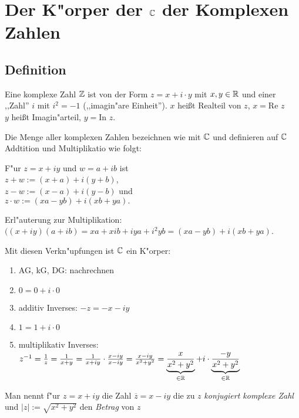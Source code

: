\section{Der K"orper der $\mathbb{C}$ der Komplexen Zahlen} 

\subsection{Definition}
Eine komplexe Zahl $\mathbb{Z}$ ist von der Form $z=x+i\cdot y$ mit $x, y \in \mathbb{R}$ und einer ,,Zahl'' $i$ mit $i^2=-1$ (,,imagin"are Einheit''). $x$ heißt Realteil von $z$, $x=$Re $z$\\
$y$ heißt Imagin"arteil, $y=$In $z$.

Die Menge aller komplexen Zahlen bezeichnen wie mit $\mathbb{C}$ und definieren auf $\mathbb{C}$ Addtition und Multiplikatio wie folgt:

F"ur $z=x+iy$ und $w=a+ib$ ist \\$z+w:= (x+a) + i (y+b)$, \\$z-w:= (x-a) + i (y-b)$ und \\$z\cdot w:= (xa-yb) + i(xb+ya).$

Erl"auterung zur Multiplikation: $((x+iy)(a+ib) = xa + xib + iya + i^2yb = (xa-yb) + i(xb+ya)$.

Mit diesen Verkn"upfungen ist $\mathbb{C}$ ein K"orper:
\begin{enumerate}
	\item
	AG, kG, DG: nachrechnen
	\item
	$0=0+i\cdot 0$
	\item
	additiv Inverses: $-z = -x-iy$
	\item
	$1=1+i\cdot 0$
	\item
	multiplikativ Inverses: $z^{-1}= \frac{1}{z}= \frac{1}{x+y}=\frac{1}{x+iy}\cdot\frac{x-iy}{x-iy}= \frac{x-iy}{x^2+y^2}=\underbrace{\frac{x}{x^2+y^2}}_{\in \mathbb{R}}+ i \cdot \underbrace{\frac{-y}{x^2+y^2}}_{\in \mathbb{R}}$
\end{enumerate}
	Man nennt f"ur $z=x+iy$ die Zahl $ \overline{z} = x-iy$ die zu $z$ \emph{konjugiert komplexe Zahl} und $|z| := \sqrt{x^2+y^2}$ den \emph{Betrag} von $z$

